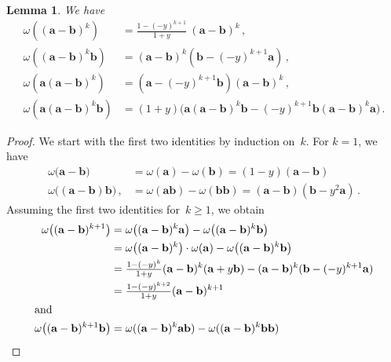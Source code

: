 \documentclass[a4paper, english,reqno, 11pt]{amsart}
\theoremstyle{plain}
\newtheorem{lemma}[theorem]{Lemma}
\theoremstyle{definition}
\newcommand{\aaa}{\mathbf{a}}
\newcommand{\bbb}{\mathbf{b}}
\begin{document}
\begin{lemma}
\label{lemma: omega evaluations}
    We have
    \begin{align*}
        \omega((\aaa-\bbb)^k) &= \tfrac{1-(-y)^{k+1}}{1+y} \ (\aaa-\bbb)^k \,, \\[5pt]
        \omega((\aaa-\bbb)^k \bbb) &= (\aaa-\bbb)^k(\bbb-(-y)^{k+1}\aaa) \,, \\[5pt]
        \omega(\aaa(\aaa-\bbb)^k) &= (\aaa-(-y)^{k+1} \bbb) (\aaa -\bbb)^k \,, \\[5pt]
        \omega(\aaa(\aaa-\bbb)^k \bbb) &= (1+y) \big(\aaa(\aaa -\bbb)^k\bbb -(-y)^{k+1} \bbb (\aaa -\bbb)^k \aaa \big) \,.
    \end{align*}
\end{lemma}
\begin{proof}
    We start with the first two identities by induction on~$k$.
    For $k=1$, we have
    \begin{align*}
        \omega\big(\aaa -\bbb\big) &= \omega(\aaa) - \omega(\bbb)= (1-y)(\aaa-\bbb) \\
        \omega\big((\aaa -\bbb)\bbb \big) \,,
        &= \omega(\aaa\bbb) -\omega(\bbb\bbb)
        = (\aaa - \bbb) (\bbb - y^2 \aaa) \,.
    \end{align*}
    Assuming the first two identities for~$k \geq 1$, we obtain
    \begin{align*}
        \omega\big((\aaa - \bbb)^{k+1}\big) 
        &= \omega\big((\aaa - \bbb)^k \aaa\big) - \omega\big((\aaa - \bbb)^k \bbb\big) \\
        &= \omega\big((\aaa - \bbb)^k\big) \cdot \omega(\aaa) - \omega\big((\aaa - \bbb)^k\bbb\big) \\
        &= \tfrac{1 - (-y)^k}{1 + y}(\aaa - \bbb)^k (\aaa + y \bbb) - (\aaa - \bbb)^k ( \bbb - (-y)^{k+1} \aaa) \\
        &= \tfrac{1 - (-y)^{k+2}}{1 + y}(\aaa - \bbb)^{k+1}  \\
        \intertext{and}
        \omega\big((\aaa - \bbb)^{k+1} \bbb\big)
        &= \omega((\aaa - \bbb)^k \aaa \bbb) - \omega((\aaa - \bbb)^k \bbb \bbb) \\

\end{align*}
\end{proof}
\end{document}
